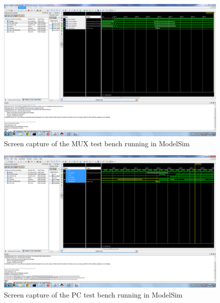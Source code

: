 \begin{figure}
	\begin{center}
		\includegraphics[keepaspectratio, width=\textwidth]{graphics/tb_mux.PNG}
		\caption{Screen capture of the MUX test bench running in ModelSim}
		\label{figure:tb-mux}
	\end{center}
\end{figure}

\begin{figure}
	\begin{center}
		\includegraphics[keepaspectratio, width=\textwidth]{graphics/tb_pc.PNG}
		\caption{Screen capture of the PC test bench running in ModelSim}
		\label{figure:tb-pc}
	\end{center}
\end{figure}

